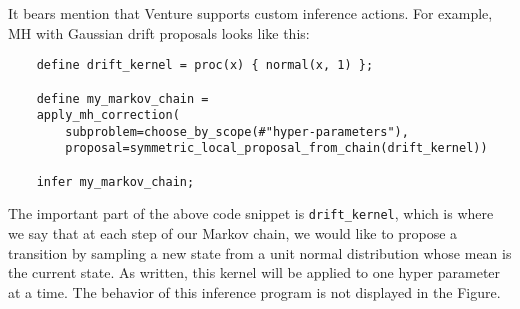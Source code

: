It bears mention that Venture supports custom inference actions.
For example, \ac{MH} with Gaussian drift proposals looks like this:
    \begin{lstlisting}
    define drift_kernel = proc(x) { normal(x, 1) };

    define my_markov_chain =
	apply_mh_correction(
	    subproblem=choose_by_scope(#"hyper-parameters"),
	    proposal=symmetric_local_proposal_from_chain(drift_kernel))

    infer my_markov_chain;
    \end{lstlisting}
The important part of the above code snippet is \texttt{drift\_kernel}, which is where we say 
that at each step of our Markov chain, we would like to propose a transition by sampling
a new state from a unit normal distribution whose mean is the current state.
As written, this kernel will be applied to one hyper parameter at a time.
The behavior of this inference program is not displayed in the Figure.
